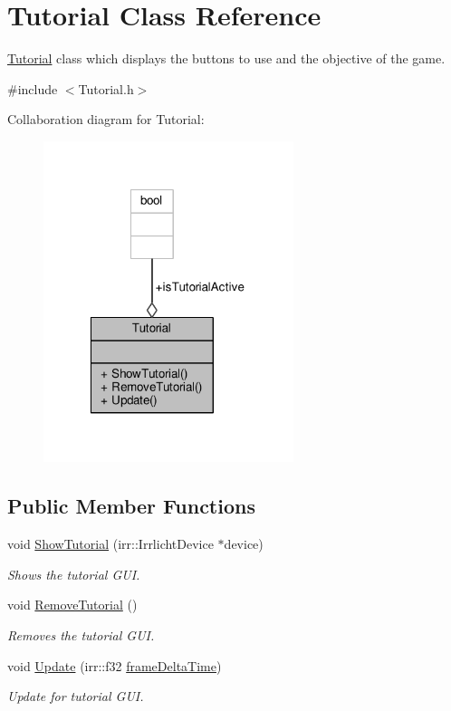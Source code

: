 \hypertarget{class_tutorial}{\section{Tutorial Class Reference}
\label{class_tutorial}
}


\hyperlink{class_tutorial}{Tutorial} class which displays the buttons to use and the objective of the game.  




{\ttfamily \#include $<$Tutorial.\-h$>$}



Collaboration diagram for Tutorial\-:
\nopagebreak
\begin{figure}[H]
\begin{center}
\leavevmode
\includegraphics[width=207pt]{class_tutorial__coll__graph}
\end{center}
\end{figure}
\subsection*{Public Member Functions}
\begin{DoxyCompactItemize}
\item 
void \hyperlink{class_tutorial_a2bcccb05a09cfb9cd14fb456a609c50b}{Show\-Tutorial} (irr\-::\-Irrlicht\-Device $\ast$device)
\begin{DoxyCompactList}\small\item\em Shows the tutorial G\-U\-I. \end{DoxyCompactList}\item 
void \hyperlink{class_tutorial_a0bef62d9bb8e461bfa119e80bacc1ca5}{Remove\-Tutorial} ()
\begin{DoxyCompactList}\small\item\em Removes the tutorial G\-U\-I. \end{DoxyCompactList}\item 
void \hyperlink{class_tutorial_a3c755730bce8d71fdd9137a048e7c732}{Update} (irr\-::f32 \hyperlink{_player_8cpp_adc988571147642cda93afbf89783f9c9}{frame\-Delta\-Time})
\begin{DoxyCompactList}\small\item\em Update for tutorial G\-U\-I. \end{DoxyCompactList}\end{DoxyCompactItemize}
